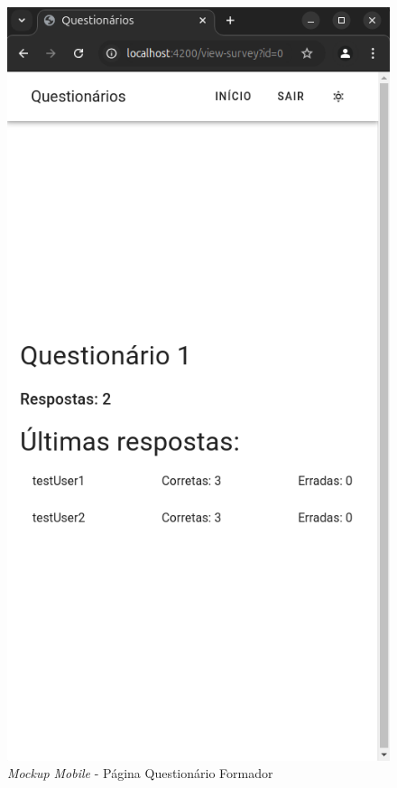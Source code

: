\documentclass[12pt,a4paper,final]{article}
\begin{document}
    \begin{figure}[H]
        \centering
        \includegraphics[width=\textwidth,height=0.9\textheight,keepaspectratio]{mockups/questionarios.wireframes-formador-questionario-mobile}
        \caption{\textit{Mockup Mobile} - Página Questionário Formador}
        \label{fig:mm-pqf}
    \end{figure}
\end{document}
